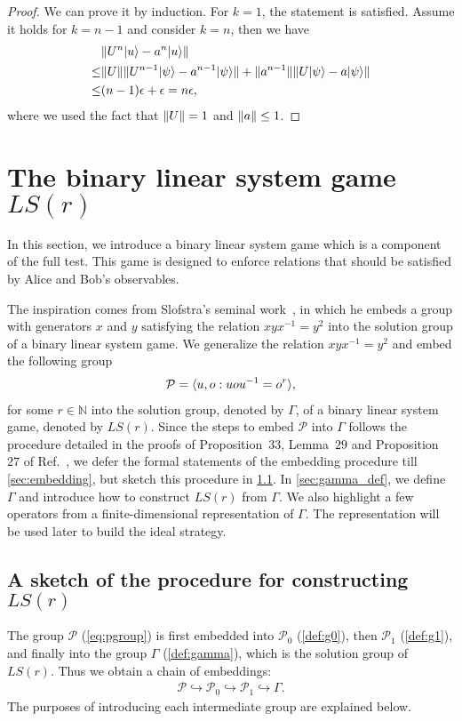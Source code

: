 \documentclass[11pt,letterpaper]{article}
\newcommand{\ket}[1]{|#1\rangle}
\DeclarePairedDelimiter{\norm}{\lVert}{\rVert}
\DeclarePairedDelimiter{\ip}{\langle}{\rangle}
\newcommand{\N}{\mathbb{N}}
\newcommand{\1}{\mathbb{1}}
\newcommand{\Pg}{\mathcal{P}}
\newcommand{\LS}{LS}
\newcommand{\ep}{\epsilon}
\theoremstyle{definition}
\begin{document}
\begin{proof}
	We can prove it by induction. 
	For $k=1$, the statement is satisfied.
	Assume it holds for $k = n-1$ and consider $k = n$, then we have
	\begin{align*}
		&\norm{U^n \ket{u} - a^n\ket{u}} \\
		\leq &\norm{U} \norm{U^{n-1} \ket{\psi} - a^{n-1}\ket{\psi}} + \norm{a^{n-1}}
		\norm{U\ket{\psi} - a \ket{\psi}}\\
		\leq &(n-1)\ep + \ep = n \ep,
	\end{align*}
	where we used the fact that $\norm{U} = 1$ and $\norm{a} \leq 1$.
\end{proof}

\section{The binary linear system game $\LS(r)$}
\label{sec:lsg}
In this section, we introduce a binary linear system game which is a component of the full test.
This game is designed to enforce relations that should be satisfied by 
Alice and Bob's observables. 

The inspiration comes from 
Slofstra's seminal work~\cite{slofstra2017}, in which he
embeds a group with generators $x$ and $y$ satisfying the relation $xyx^{-1}=y^2$
into the solution group of a binary linear system game.  
We generalize the relation $xyx^{-1} = y^2$ and embed the 
following group
\begin{align}
    \Pg = \ip{u,o:uou^{-1} = o^r},
\label{eq:pgroup}
\end{align}
for some $r \in \N$ into the solution group, denoted by $\Gamma$, of a binary linear system game, denoted by $\LS(r)$.
Since the steps to embed $\Pg$ into $\Gamma$ follows the procedure detailed in the proofs of Proposition~$33$, Lemma~$29$ and
Proposition $27$ of Ref.~\cite{slofstra2017}, 
we defer the formal statements of the embedding procedure till \cref{sec:embedding},
but sketch this procedure in \cref{sec:embed_idea}. 
In \cref{sec:gamma_def}, we define $\Gamma$ and introduce how to
construct $\LS(r)$ from $\Gamma$.
We also highlight a few operators from a finite-dimensional representation of $\Gamma$.
The representation will be used later to build the ideal strategy.

\subsection{A sketch of the procedure
for constructing $\LS ( r )$}
\label{sec:embed_idea}
The group $\Pg$ (\cref{eq:pgroup}) is first embedded into $\Pg_0$ (\cref{def:g0}), then $\Pg_1$ (\cref{def:g1}), and finally into the group $\Gamma$ (\cref{def:gamma}), which is the
solution group of $\LS ( r )$.  
Thus we obtain a chain of embeddings:
\begin{align}
\Pg \hookrightarrow \Pg_0 \hookrightarrow \Pg_1 \hookrightarrow
\Gamma.
\end{align}
The purposes of introducing each intermediate
group are explained below.
\end{document}
